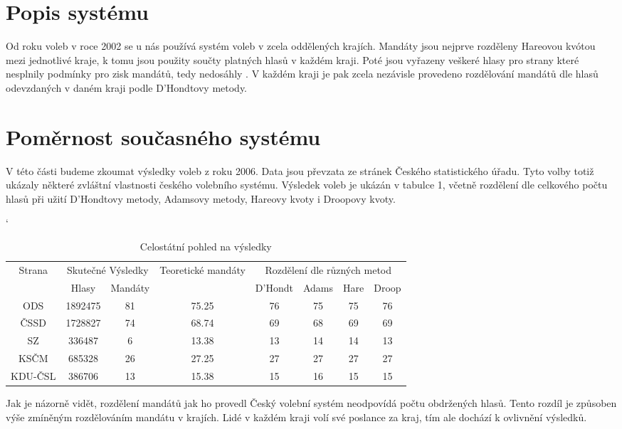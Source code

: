 \documentclass[12pt]{report}
\begin{document}
\section{Popis systému}
Od roku voleb v roce 2002 se u nás používá systém voleb v zcela oddělených krajích.
Mandáty jsou nejprve rozděleny Hareovou kvótou mezi jednotlivé kraje, k tomu jsou použity součty platných hlasů v každém kraji.
Poté jsou vyřazeny veškeré hlasy pro strany které nesplnily podmínky pro zisk mandátů, tedy nedosáhly .
V každém kraji je pak zcela nezávisle provedeno rozdělování mandátů dle hlasů odevzdaných v daném kraji podle D'Hondtovy metody.
\section{Poměrnost současného systému}
V této části budeme zkoumat výsledky voleb z roku 2006.
Data jsou převzata ze stránek Českého statistického úřadu.\autocite{CSU}
Tyto volby totiž ukázaly některé zvláštní vlastnosti českého volebního systému.
Výsledek voleb je ukázán v tabulce 1, včetně rozdělení dle celkového počtu hlasů při užití D'Hondtovy metody, Adamsovy metody, Hareovy kvoty i Droopovy kvoty.
\begin{table}[p]
\catcode`
\begin{tabular}{|c|c|c|c|c|c|c|c|} \hline \multirow{2}{*}{Strana} & \multicolumn{2}{|c|}{Skutečné Výsledky} & \multirow{2}{*}{Teoretické mandáty} & \multicolumn{4}{|c|}{Rozdělení dle různých metod} \\
\cline{2-3} \cline{5-8} & Hlasy & Mandáty & & D'Hondt & Adams & Hare & Droop \\
\hline ODS & 1892475 & 81 & 75.25 & 76 & 75 & 75 & 76 \\
\hline ČSSD & 1728827 & 74 & 68.74 & 69 & 68 & 69 & 69 \\
\hline SZ & 336487 & 6 & 13.38 & 13 & 14 & 14 & 13 \\
\hline KSČM & 685328 & 26 & 27.25 & 27 & 27 & 27 & 27 \\
\hline KDU-ČSL & 386706 & 13 & 15.38 & 15 & 16 & 15 & 15 \\
\hline
\end{tabular}
\caption{Celostátní pohled na výsledky}
\end{table}
Jak je názorně vidět, rozdělení mandátů jak ho provedl Český volební systém neodpovídá počtu obdržených hlasů.
Tento rozdíl je způsoben výše zmíněným rozdělováním mandátu v krajích.
Lidé v každém kraji volí své poslance  za kraj, tím ale dochází k ovlivnění výsledků.
\end{document}
